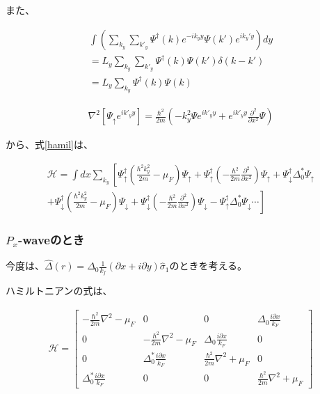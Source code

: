 \documentclass{jsarticle}
\begin{document}
            また、
    
            \begin{align}
            \int \left( \sum_{k_y}\sum_{k'_y}\Psi^\dagger(k) e^{-ik_yy}\Psi(k')e^{ik_y'y} \right) dy \nonumber \\
            =L_y\sum_{k_y}\sum_{k'_y}\Psi^\dagger(k) \Psi(k')\delta \left( k-k' \right) \nonumber \\
            =L_y\sum_{k_y}\Psi^\dagger(k)\Psi(k)
            \end{align}
    
            \begin{align}
                \nabla^2 \left[ \Psi_\uparrow e^{ik'_yy} \right]=
                \frac{\hbar^2}{2m}
                \left( -k_y^2\Psi e^{ik'_yy} + e^{ik'_yy}\frac{\partial^2}{\partial x^2}\Psi \right)
            \end{align}
    
    
            から、式\eqref{hamil}は、
    
            \begin{align}
                \mathcal{H}=\int dx \sum_{k_y}
                \left[ \Psi_\uparrow^\dagger \left( \frac{\hbar^2k_y^2}{2m}-\mu_F \right)\Psi_\uparrow
                +\Psi_\uparrow^\dagger \left(- \frac{\hbar^2}{2m}\frac{\partial^2}{\partial x^2}\right)\Psi_\uparrow
                +\Psi_\downarrow^\dagger \Delta_0^\ast \Psi_\uparrow \right. \nonumber \\ \left.+
                \Psi_\downarrow^\dagger \left( \frac{\hbar^2k_y^2}{2m}-\mu_F \right)\Psi_\downarrow
                +\Psi_\downarrow^\dagger \left(- \frac{\hbar^2}{2m}\frac{\partial^2}{\partial x^2} \right) \Psi_\downarrow
                -\Psi_\uparrow^\dagger \Delta_0^\ast \Psi_\downarrow \cdots
                \right]
                \label{hamil1}
            \end{align}
            
            \subsubsection{$P_x$-waveのとき}
             今度は、$\hat{\Delta}(r)=\Delta_0\frac{1}{k_f} \left( \partial x+i\partial y \right)\hat{\sigma}_1$のときを考える。

            ハミルトニアンの式は、
            
            \begin{align}
                \mathcal{H}=
                \begin{bmatrix}
                    -\frac{\hbar^2}{2m}\nabla^2-\mu_F & 0 & 0 & \Delta_0\frac{i\partial x}{k_F} \\
                    0 & -\frac{\hbar^2}{2m}\nabla^2-\mu_F & \Delta_0\frac{i\partial x}{k_F} & 0 \\
                    0 & \Delta_0^\ast\frac{i\partial x}{k_F} & \frac{\hbar^2}{2m}\nabla^2+\mu_F & 0 \\
                     \Delta_0^\ast\frac{i\partial x}{k_F} & 0 & 0 & \frac{\hbar^2}{2m}\nabla^2+\mu_F
                \end{bmatrix}
            \end{align}
    
\end{document}
